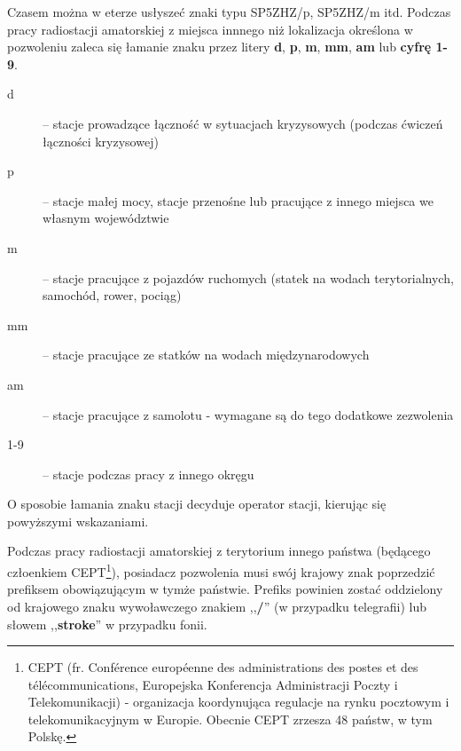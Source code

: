 \documentclass[]{mgr}
\begin{document}
            Czasem można w eterze usłyszeć znaki typu SP5ZHZ/p, SP5ZHZ/m itd. Podczas pracy radiostacji amatorskiej z miejsca innnego niż lokalizacja określona w pozwoleniu zaleca się łamanie znaku przez litery \textbf{d}, \textbf{p}, \textbf{m}, \textbf{mm}, \textbf{am} lub \textbf{cyfrę 1-9}.

            \begin{description}
                \item[d] -- stacje prowadzące łączność w sytuacjach kryzysowych (podczas ćwiczeń łączności kryzysowej)
                \item[p] -- stacje małej mocy, stacje przenośne lub pracujące z innego miejsca we własnym województwie
                \item[m] -- stacje pracujące z pojazdów ruchomych (statek na wodach terytorialnych, samochód, rower, pociąg)
                \item[mm] -- stacje pracujące ze statków na wodach międzynarodowych
                \item[am] -- stacje pracujące z samolotu - wymagane są do tego dodatkowe zezwolenia
                \item[1-9] -- stacje podczas pracy z innego okręgu
            \end{description}
            O sposobie łamania znaku stacji decyduje operator stacji, kierując się powyższymi wskazaniami.

            Podczas pracy radiostacji amatorskiej z terytorium innego państwa (będącego człoenkiem CEPT\footnote{CEPT (fr. Conférence européenne des administrations des postes et des télécommunications, Europejska Konferencja Administracji Poczty i Telekomunikacji) - organizacja koordynująca regulacje na rynku pocztowym i telekomunikacyjnym w Europie. Obecnie CEPT zrzesza 48 państw, w tym Polskę.}), posiadacz pozwolenia musi swój krajowy znak poprzedzić prefiksem obowiązującym w tymże państwie. Prefiks powinien zostać oddzielony od krajowego znaku wywoławczego znakiem ,,\textbf{/}'' (w przypadku telegrafii) lub słowem ,,\textbf{stroke}'' w przypadku fonii.
\end{document}
